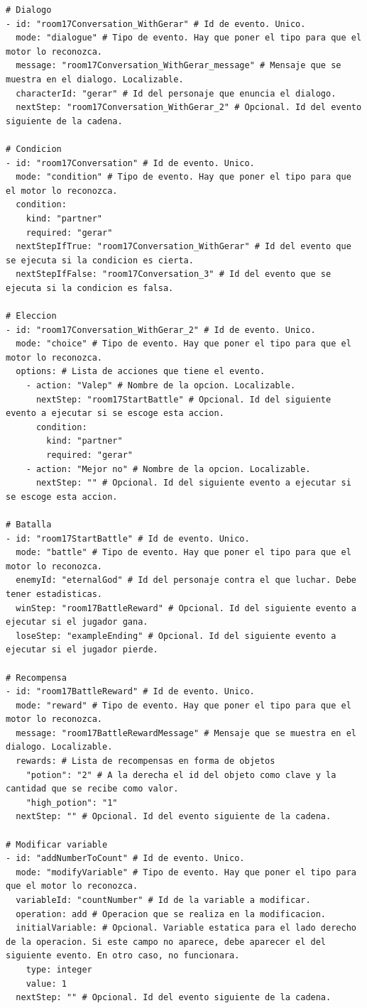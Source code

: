 \begin{lstlisting}
# Dialogo
- id: "room17Conversation_WithGerar" # Id de evento. Unico.
  mode: "dialogue" # Tipo de evento. Hay que poner el tipo para que el motor lo reconozca.
  message: "room17Conversation_WithGerar_message" # Mensaje que se muestra en el dialogo. Localizable.
  characterId: "gerar" # Id del personaje que enuncia el dialogo.
  nextStep: "room17Conversation_WithGerar_2" # Opcional. Id del evento siguiente de la cadena.

# Condicion
- id: "room17Conversation" # Id de evento. Unico.
  mode: "condition" # Tipo de evento. Hay que poner el tipo para que el motor lo reconozca.
  condition:
	kind: "partner"
	required: "gerar"
  nextStepIfTrue: "room17Conversation_WithGerar" # Id del evento que se ejecuta si la condicion es cierta.
  nextStepIfFalse: "room17Conversation_3" # Id del evento que se ejecuta si la condicion es falsa.

# Eleccion
- id: "room17Conversation_WithGerar_2" # Id de evento. Unico.
  mode: "choice" # Tipo de evento. Hay que poner el tipo para que el motor lo reconozca.
  options: # Lista de acciones que tiene el evento.
	- action: "Valep" # Nombre de la opcion. Localizable.
	  nextStep: "room17StartBattle" # Opcional. Id del siguiente evento a ejecutar si se escoge esta accion.
	  condition:
		kind: "partner"
		required: "gerar"
	- action: "Mejor no" # Nombre de la opcion. Localizable.
	  nextStep: "" # Opcional. Id del siguiente evento a ejecutar si se escoge esta accion.

# Batalla
- id: "room17StartBattle" # Id de evento. Unico.
  mode: "battle" # Tipo de evento. Hay que poner el tipo para que el motor lo reconozca.
  enemyId: "eternalGod" # Id del personaje contra el que luchar. Debe tener estadisticas.
  winStep: "room17BattleReward" # Opcional. Id del siguiente evento a ejecutar si el jugador gana.
  loseStep: "exampleEnding" # Opcional. Id del siguiente evento a ejecutar si el jugador pierde.

# Recompensa
- id: "room17BattleReward" # Id de evento. Unico.
  mode: "reward" # Tipo de evento. Hay que poner el tipo para que el motor lo reconozca.
  message: "room17BattleRewardMessage" # Mensaje que se muestra en el dialogo. Localizable.
  rewards: # Lista de recompensas en forma de objetos
	"potion": "2" # A la derecha el id del objeto como clave y la cantidad que se recibe como valor.
	"high_potion": "1"
  nextStep: "" # Opcional. Id del evento siguiente de la cadena.

# Modificar variable
- id: "addNumberToCount" # Id de evento. Unico.
  mode: "modifyVariable" # Tipo de evento. Hay que poner el tipo para que el motor lo reconozca.
  variableId: "countNumber" # Id de la variable a modificar.
  operation: add # Operacion que se realiza en la modificacion.
  initialVariable: # Opcional. Variable estatica para el lado derecho de la operacion. Si este campo no aparece, debe aparecer el del siguiente evento. En otro caso, no funcionara.
	type: integer
	value: 1
  nextStep: "" # Opcional. Id del evento siguiente de la cadena.
  

\end{lstlisting}
